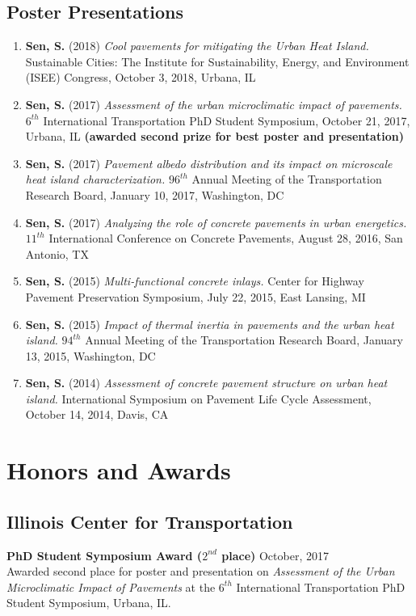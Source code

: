 \documentclass[12pt]{article}
\begin{document}
\subsection*{Poster Presentations}
\begin{enumerate}[label=(\arabic*)]
	\item \textbf{Sen, S.} (2018) \textit{Cool pavements for mitigating the Urban Heat Island.} Sustainable Cities: The Institute for Sustainability, Energy, and Environment (ISEE) Congress, October 3, 2018, Urbana, IL 
	\item \textbf{Sen, S.} (2017) \textit{Assessment of the urban microclimatic impact of pavements.} $6^{th}$ International Transportation PhD Student Symposium, October 21, 2017, Urbana, IL \textbf{(awarded second prize for best poster and presentation)}
	\item \textbf{Sen, S.} (2017) \textit{Pavement albedo distribution and its impact on microscale heat island characterization.} $96^{th}$ Annual Meeting of the Transportation Research Board, January 10, 2017, Washington, DC
	\item \textbf{Sen, S.} (2017) \textit{Analyzing the role of concrete pavements in urban energetics.} $11^{th}$ International Conference on Concrete Pavements, August 28, 2016, San Antonio, TX
	\item \textbf{Sen, S.} (2015) \textit{Multi-functional concrete inlays.} Center for Highway Pavement Preservation Symposium, July 22, 2015, East Lansing, MI
	\item \textbf{Sen, S.} (2015) \textit{Impact of thermal inertia in pavements and the urban heat island.} $94^{th}$ Annual Meeting of the Transportation Research Board, January 13, 2015, Washington, DC
	\item \textbf{Sen, S.} (2014) \textit{Assessment of concrete pavement structure on urban heat island.} International Symposium on Pavement Life Cycle Assessment, October 14, 2014, Davis, CA
\end{enumerate}

\section*{Honors and Awards}
\subsection*{Illinois Center for Transportation}
\textbf{PhD Student Symposium Award ($2^{nd}$ place)} \hfill October, 2017 \\
Awarded second place for poster and presentation on \textit{Assessment of the Urban Microclimatic Impact of Pavements} at the $6^{th}$ International Transportation PhD Student Symposium, Urbana, IL. \\
\end{document}
